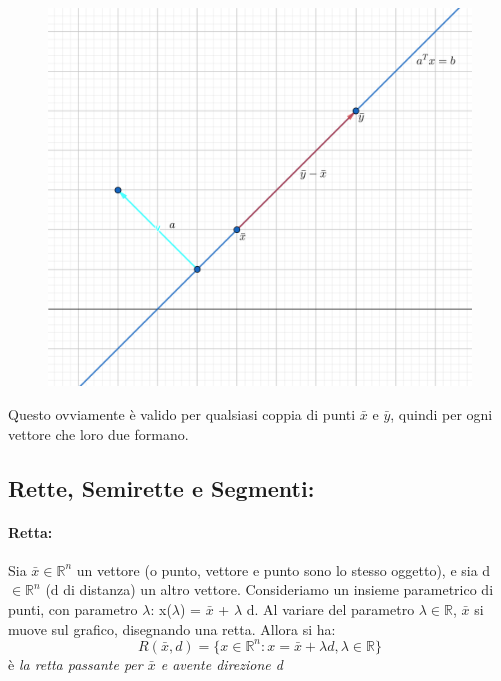 \begin{figure}[h!]
    \centering
    \includegraphics[scale=0.5]{angolirette.png}
\end{figure}

\noindent Questo ovviamente è valido per qualsiasi coppia di punti $\bar{x}$ e $\bar{y}$, quindi per ogni vettore che loro due formano.



\subsection{Rette, Semirette e Segmenti:} 

\paragraph{Retta:} Sia $\bar{x} \in \mathbb{R}^n$ un vettore (o punto, vettore e punto sono lo stesso oggetto), e sia d $\in \mathbb{R}^n$ (d di distanza) un altro vettore. Consideriamo un insieme parametrico di punti, con parametro $\lambda$: x($\lambda$) = $\bar{x}$ + $\lambda$ d. Al variare del parametro $\lambda \in \mathbb{R}$, $\bar{x}$ si muove sul grafico, disegnando una retta. Allora si ha:
\begin{equation*}
    R(\bar{x}, d) = \{x \in \mathbb{R}^n: x = \bar{x} + \lambda d, \lambda \in \mathbb{R}\}
\end{equation*}
è \textit{la retta passante per $\bar{x}$ e avente direzione d}

